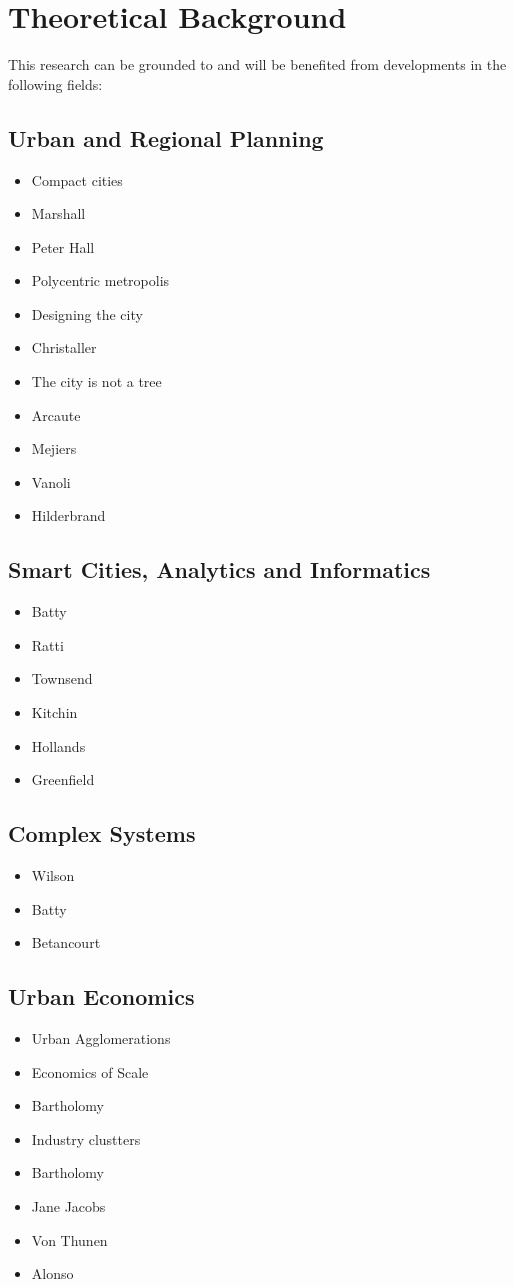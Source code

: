 \section{Theoretical Background}
This research can be grounded to and will be benefited from developments in the following fields:
\subsection{Urban and Regional Planning}
\begin{itemize}
    \item Compact cities
    \item Marshall
    \item Peter Hall
    \item Polycentric metropolis
    \item Designing the city
    \item Christaller
    \item The city is not a tree
    \item Arcaute
    \item Mejiers
    \item Vanoli
    \item Hilderbrand
\end{itemize}

\subsection{Smart Cities, Analytics and Informatics}
\begin{itemize}
    \item Batty
    \item Ratti
    \item Townsend
    \item Kitchin
    \item Hollands  
    \item Greenfield
\end{itemize}

\subsection{Complex Systems}
\begin{itemize}
    \item Wilson 
    \item Batty
    \item Betancourt
\end{itemize}
\subsection{Urban Economics}
\begin{itemize}
    \item Urban Agglomerations
    \item Economics of Scale
    \item Bartholomy
    \item Industry clustters
    \item Bartholomy
    \item Jane Jacobs
    \item Von Thunen 
    \item Alonso
\end{itemize}

